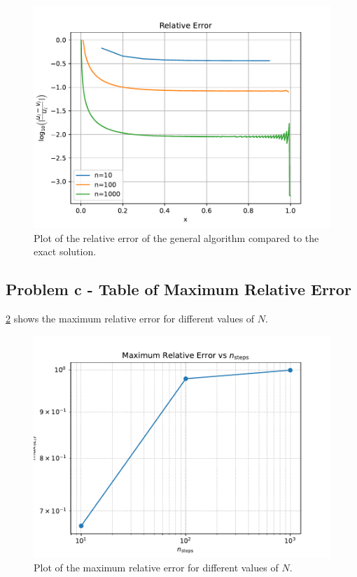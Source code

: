 \documentclass[english,notitlepage]{revtex4-1}  %
\begin{document}
\begin{figure}[h!]
    \centering %
    \includegraphics[scale=0.70]{problem8/relative_error_plot.pdf} %
    \caption{Plot of the relative error of the general algorithm compared to the exact solution.} %
    \label{fig:relative_error} %
\end{figure}

\subsection*{Problem c - Table of Maximum Relative Error}

\figurename{ \ref{fig:max_relative_error}} shows the maximum relative error for different values of \( N \).

\begin{figure}[h!]
    \centering %
    \includegraphics[scale=0.70]{problem8/max_relative_error_plot.pdf} %
    \caption{Plot of the maximum relative error for different values of \( N \).} %
    \label{fig:max_relative_error} %
\end{figure}
\end{document}
